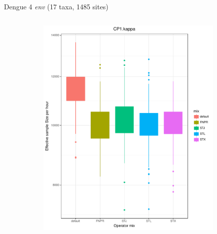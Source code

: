 \documentclass[newPxFont,numfooter,sectionpages]{beamer}
\begin{document}
\begin{frame}{Dengue 4 \textit{env} (17 taxa, 1485 sites)}
\begin{figure}
\begin{column}{0.5\textwidth}
    \begin{figure}
     \includegraphics[width=\textwidth]{figures/ESS_hour_CP1Kappa_dengue4.pdf} \\
     \end{figure}
\end{column}
\begin{column}{0.5\textwidth}  %
    \begin{figure}

\end{figure}
\end{column}
\end{figure}
\end{frame}
\end{document}
